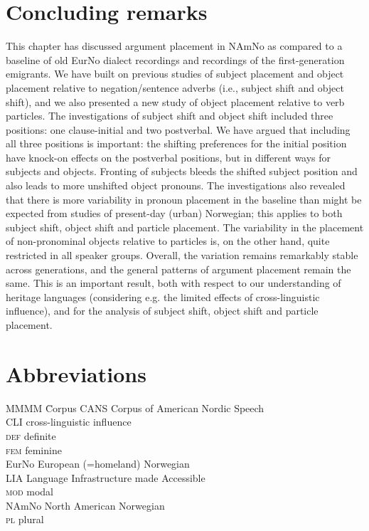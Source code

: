 \documentclass[output=paper]{langscibook}
\begin{document}
\section{Concluding remarks}\label{sec:larsson:7}

This chapter has discussed argument placement in NAmNo as compared to a baseline of old EurNo dialect recordings and recordings of the first-generation emigrants. We have built on previous studies of subject placement and object placement relative to negation/sentence adverbs (i.e., subject shift and object shift), and we also presented a new study of object placement relative to verb particles. The investigations of subject shift and object shift included three positions: one clause-initial and two postverbal. We have argued that including all three positions is important: the shifting preferences for the initial position have knock-on effects on the postverbal positions, but in different ways for subjects and objects. Fronting of subjects bleeds the shifted subject position and also leads to more unshifted object pronouns. The investigations also revealed that there is more variability in pronoun placement in the baseline than might be expected from studies of present-day (urban) Norwegian; this applies to both subject shift, object shift and particle placement. The variability in the placement of non-pronominal objects relative to particles is, on the other hand, quite restricted in all speaker groups. Overall, the variation remains remarkably stable across generations, and the general patterns of argument placement remain the same. This is an important result, both with respect to our understanding of heritage languages (considering e.g. the limited effects of cross-linguistic influence), and for the analysis of subject shift, object shift and particle placement. 

\section*{Abbreviations}
\begin{tabbing} 
MMMM   \= Corpus\kill
CANS   \> Corpus of American Nordic Speech\\
CLI    \> cross-linguistic influence\\
\textsc{def}    \> definite\\
\textsc{fem}    \> feminine \\
EurNo  \> European (=homeland) Norwegian\\
LIA    \> Language Infrastructure made Accessible\\
\textsc{mod}    \> modal\\
NAmNo  \> North American Norwegian\\
\textsc{pl}     \> plural  
\end{tabbing}
\end{document}
